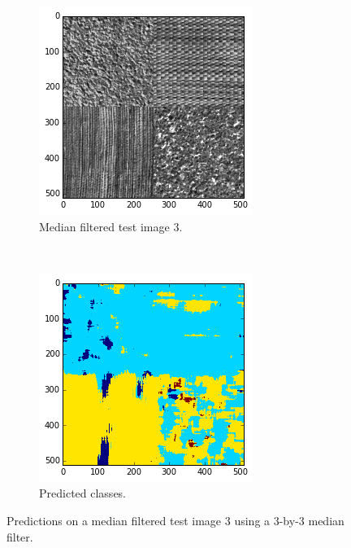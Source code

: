 \documentclass[a4paper]{article}
\begin{document}
\begin{figure}
    \centering
    \begin{subfigure}[t]{0.23\textwidth}
        \includegraphics[width=\textwidth]{median_filt.png}
        \caption{%
            Median filtered test image 3.
        }
    \end{subfigure}
    ~
    \begin{subfigure}[t]{0.23\textwidth}
        \centering
        \includegraphics[width=\textwidth]{median_filt_pred.png}
        \caption{%
            Predicted classes.
        }
    \end{subfigure}
    \caption{%
        Predictions on a median filtered test image 3 using a 3-by-3
        median filter.
    }
    \label{fig:median_filt_pred}
\end{figure}
\end{document}
